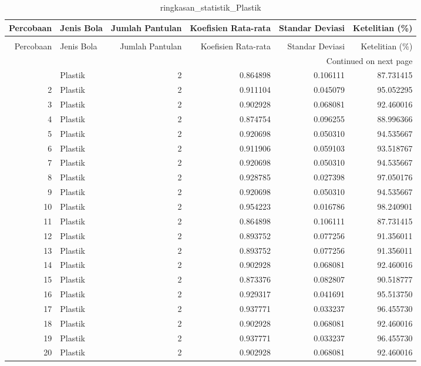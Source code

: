 \begin{longtable}{rlrrrr}
\caption{ringkasan_statistik_Plastik} \label{tab:ringkasan_Plastik} \\
\toprule
Percobaan & Jenis Bola & Jumlah Pantulan & Koefisien Rata-rata & Standar Deviasi & Ketelitian (\%) \\
\midrule
\endfirsthead
\caption[]{ringkasan_statistik_Plastik} \\
\toprule
Percobaan & Jenis Bola & Jumlah Pantulan & Koefisien Rata-rata & Standar Deviasi & Ketelitian (\%) \\
\midrule
\endhead
\midrule
\multicolumn{6}{r}{Continued on next page} \\
\midrule
\endfoot
\bottomrule
\endlastfoot
1 & Plastik & 2 & 0.864898 & 0.106111 & 87.731415 \\
2 & Plastik & 2 & 0.911104 & 0.045079 & 95.052295 \\
3 & Plastik & 2 & 0.902928 & 0.068081 & 92.460016 \\
4 & Plastik & 2 & 0.874754 & 0.096255 & 88.996366 \\
5 & Plastik & 2 & 0.920698 & 0.050310 & 94.535667 \\
6 & Plastik & 2 & 0.911906 & 0.059103 & 93.518767 \\
7 & Plastik & 2 & 0.920698 & 0.050310 & 94.535667 \\
8 & Plastik & 2 & 0.928785 & 0.027398 & 97.050176 \\
9 & Plastik & 2 & 0.920698 & 0.050310 & 94.535667 \\
10 & Plastik & 2 & 0.954223 & 0.016786 & 98.240901 \\
11 & Plastik & 2 & 0.864898 & 0.106111 & 87.731415 \\
12 & Plastik & 2 & 0.893752 & 0.077256 & 91.356011 \\
13 & Plastik & 2 & 0.893752 & 0.077256 & 91.356011 \\
14 & Plastik & 2 & 0.902928 & 0.068081 & 92.460016 \\
15 & Plastik & 2 & 0.873376 & 0.082807 & 90.518777 \\
16 & Plastik & 2 & 0.929317 & 0.041691 & 95.513750 \\
17 & Plastik & 2 & 0.937771 & 0.033237 & 96.455730 \\
18 & Plastik & 2 & 0.902928 & 0.068081 & 92.460016 \\
19 & Plastik & 2 & 0.937771 & 0.033237 & 96.455730 \\
20 & Plastik & 2 & 0.902928 & 0.068081 & 92.460016 \\
\end{longtable}
